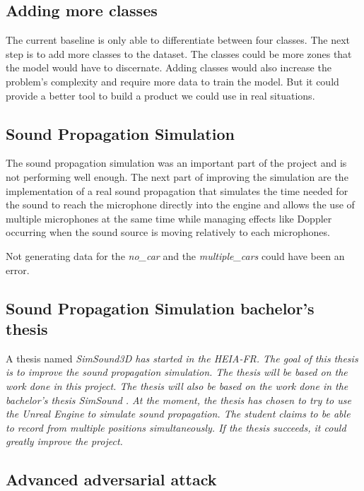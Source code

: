 \subsection{Adding more classes}

The current baseline is only able to differentiate between four classes. The next step is to add more classes to the dataset. The classes could be more zones that the model would have to discernate. Adding classes would also increase the problem's complexity and require more data to train the model. But it could provide a better tool to build a product we could use in real situations.

\subsection{Sound Propagation Simulation}

The sound propagation simulation was an important part of the project and is not performing well enough. The next part of improving the simulation are the implementation of a real sound propagation that simulates the time needed for the sound to reach the microphone directly into the engine and allows the use of multiple microphones at the same time while managing effects like Doppler occurring when the sound source is moving relatively to each microphones.

Not generating data for the \textit{no\_car} and the \textit{multiple\_cars} could have been an error. 

\subsection{Sound Propagation Simulation bachelor's thesis}

A thesis named \it{SimSound3D} has started in the HEIA-FR. The goal of this thesis is to improve the sound propagation simulation. The thesis will be based on the work done in this project. The thesis will also be based on the work done in the bachelor's thesis \it{SimSound} \cite{bachelor_thesis_simsound}. At the moment, the thesis has chosen to try to use the Unreal Engine to simulate sound propagation. The student claims to be able to record from multiple positions simultaneously. If the thesis succeeds, it could greatly improve the project.

\subsection{Advanced adversarial attack}

